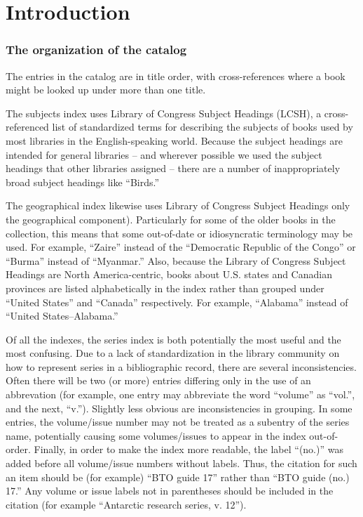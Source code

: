 \chapter*{Introduction}

\subsection*{The organization of the catalog}

The entries in the catalog are in title order, with cross-references where a
book might be looked up under more than one title.

The subjects index uses Library of Congress Subject Headings (LCSH), a
cross-referenced list of standardized terms for describing the subjects of books
used by most libraries in the English-speaking world. Because the subject headings
are intended for general libraries -- and wherever possible we used the subject
headings that other libraries assigned -- there are a number of inappropriately
broad subject headings like ``Birds.''

The geographical index likewise uses Library of Congress Subject Headings only
the geographical component). Particularly for some of the older books in the
collection, this means that some out-of-date or idiosyncratic terminology may be
used. For example, ``Zaire'' instead of the ``Democratic Republic of the Congo''
or ``Burma'' instead of ``Myanmar.'' Also, because the Library of Congress
Subject Headings are North America-centric, books about U.S. states and Canadian
provinces are listed alphabetically in the index rather than grouped under
``United States'' and ``Canada'' respectively. For example, ``Alabama'' instead
of ``United States--Alabama.''

Of all the indexes, the series index is both potentially the most useful and
the most confusing. Due to a lack of standardization in the library community
on how to represent series in a bibliographic record, there are several
inconsistencies. Often there will be two (or more) entries differing only in
the use of an abbrevation (for example, one entry may abbreviate the word
``volume'' as ``vol.'', and the next, ``v.''). Slightly less obvious are
inconsistencies in grouping. In some entries, the volume/issue number may not
be treated as a subentry of the series name, potentially causing some
volumes/issues to appear in the index out-of-order.  Finally, in order to make
the index more readable, the label ``(no.)'' was added before all volume/issue
numbers without labels. Thus, the citation for such an item should be (for
example) ``BTO guide 17'' rather than ``BTO guide (no.) 17.'' Any volume or issue
labels not in parentheses should be included in the citation (for example
``Antarctic research series, v. 12'').
